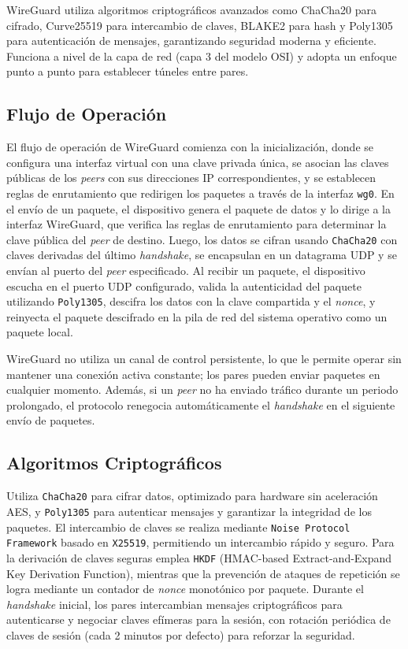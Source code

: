     WireGuard utiliza algoritmos criptográficos avanzados como ChaCha20 para cifrado, Curve25519 para intercambio de claves, BLAKE2 para hash y Poly1305 para autenticación de mensajes, garantizando seguridad moderna y eficiente. Funciona a nivel de la capa de red (capa 3 del modelo OSI) y adopta un enfoque punto a punto para establecer túneles entre pares.

\subsection{Flujo de Operación}  
   El flujo de operación de WireGuard comienza con la inicialización, donde se configura una interfaz virtual con una clave privada única, se asocian las claves públicas de los \textit{peers} con sus direcciones IP correspondientes, y se establecen reglas de enrutamiento que redirigen los paquetes a través de la interfaz \texttt{wg0}. En el envío de un paquete, el dispositivo genera el paquete de datos y lo dirige a la interfaz WireGuard, que verifica las reglas de enrutamiento para determinar la clave pública del \textit{peer} de destino. Luego, los datos se cifran usando \texttt{ChaCha20} con claves derivadas del último \textit{handshake}, se encapsulan en un datagrama UDP y se envían al puerto del \textit{peer} especificado. Al recibir un paquete, el dispositivo escucha en el puerto UDP configurado, valida la autenticidad del paquete utilizando \texttt{Poly1305}, descifra los datos con la clave compartida y el \textit{nonce}, y reinyecta el paquete descifrado en la pila de red del sistema operativo como un paquete local.
  
   WireGuard no utiliza un canal de control persistente, lo que le permite operar sin mantener una conexión activa constante; los pares pueden enviar paquetes en cualquier momento. Además, si un \textit{peer} no ha enviado tráfico durante un periodo prolongado, el protocolo renegocia automáticamente el \textit{handshake} en el siguiente envío de paquetes.
   
   \subsection{Algoritmos Criptográficos}  
   Utiliza \texttt{ChaCha20} para cifrar datos, optimizado para hardware sin aceleración AES, y \texttt{Poly1305} para autenticar mensajes y garantizar la integridad de los paquetes. El intercambio de claves se realiza mediante \texttt{Noise Protocol Framework} basado en \texttt{X25519}, permitiendo un intercambio rápido y seguro. Para la derivación de claves seguras emplea \texttt{HKDF} (HMAC-based Extract-and-Expand Key Derivation Function), mientras que la prevención de ataques de repetición se logra mediante un contador de \textit{nonce} monotónico por paquete. Durante el \textit{handshake} inicial, los pares intercambian mensajes criptográficos para autenticarse y negociar claves efímeras para la sesión, con rotación periódica de claves de sesión (cada 2 minutos por defecto) para reforzar la seguridad.
   
